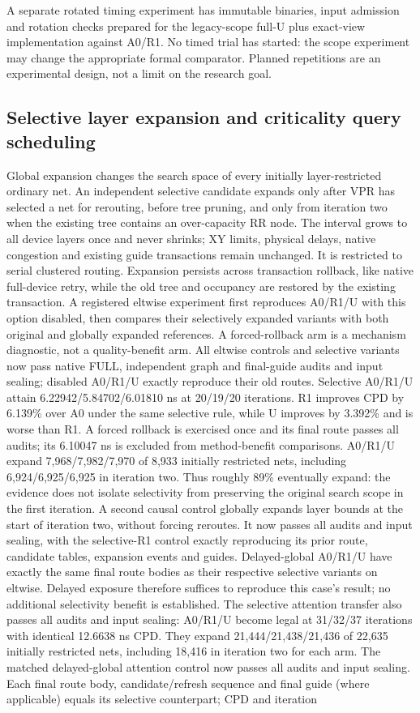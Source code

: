 \documentclass[conference,10pt]{IEEEtran}
\begin{document}
A separate rotated timing experiment has immutable binaries, input admission and rotation checks prepared for the legacy-scope full-U plus exact-view implementation against A0/R1. No timed trial has started: the scope experiment may change the appropriate formal comparator. Planned repetitions are an experimental design, not a limit on the research goal.


\subsection{Selective layer expansion and criticality query scheduling}
Global expansion changes the search space of every initially layer-restricted ordinary net. An independent selective candidate expands only after VPR has selected a net for rerouting, before tree pruning, and only from iteration two when the existing tree contains an over-capacity RR node. The interval grows to all device layers once and never shrinks; XY limits, physical delays, native congestion and existing guide transactions remain unchanged. It is restricted to serial clustered routing. Expansion persists across transaction rollback, like native full-device retry, while the old tree and occupancy are restored by the existing transaction. A registered eltwise experiment first reproduces A0/R1/U with this option disabled, then compares their selectively expanded variants with both original and globally expanded references. A forced-rollback arm is a mechanism diagnostic, not a quality-benefit arm. All eltwise controls and selective variants now pass native FULL, independent graph and final-guide audits and input sealing; disabled A0/R1/U exactly reproduce their old routes. Selective A0/R1/U attain 6.22942/5.84702/6.01810 ns at 20/19/20 iterations. R1 improves CPD by 6.139\% over A0 under the same selective rule, while U improves by 3.392\% and is worse than R1. A forced rollback is exercised once and its final route passes all audits; its 6.10047 ns is excluded from method-benefit comparisons. A0/R1/U expand 7,968/7,982/7,970 of 8,933 initially restricted nets, including 6,924/6,925/6,925 in iteration two. Thus roughly 89\% eventually expand: the evidence does not isolate selectivity from preserving the original search scope in the first iteration. A second causal control globally expands layer bounds at the start of iteration two, without forcing reroutes. It now passes all audits and input sealing, with the selective-R1 control exactly reproducing its prior route, candidate tables, expansion events and guides. Delayed-global A0/R1/U have exactly the same final route bodies as their respective selective variants on eltwise. Delayed exposure therefore suffices to reproduce this case's result; no additional selectivity benefit is established. The selective attention transfer also passes all audits and input sealing: A0/R1/U become legal at 31/32/37 iterations with identical 12.6638 ns CPD. They expand 21,444/21,438/21,436 of 22,635 initially restricted nets, including 18,416 in iteration two for each arm. The matched delayed-global attention control now passes all audits and input sealing. Each final route body, candidate/refresh sequence and final guide (where applicable) equals its selective counterpart; CPD and iteration 
\end{document}

